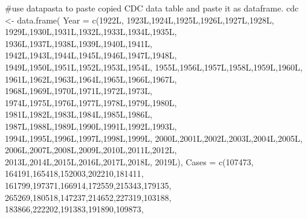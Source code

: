 \documentclass[
  letterpaper,
  DIV=11,
  numbers=noendperiod]{scrartcl}
\newenvironment{Shaded}{\begin{snugshade}}{\end{snugshade}}
\newcommand{\AttributeTok}[1]{\textcolor[rgb]{0.40,0.45,0.13}{#1}}
\newcommand{\CommentTok}[1]{\textcolor[rgb]{0.37,0.37,0.37}{#1}}
\newcommand{\DecValTok}[1]{\textcolor[rgb]{0.68,0.00,0.00}{#1}}
\newcommand{\FunctionTok}[1]{\textcolor[rgb]{0.28,0.35,0.67}{#1}}
\newcommand{\NormalTok}[1]{\textcolor[rgb]{0.00,0.23,0.31}{#1}}
\newcommand{\OtherTok}[1]{\textcolor[rgb]{0.00,0.23,0.31}{#1}}
\begin{document}
\begin{Shaded}
\begin{Highlighting}[]
\CommentTok{\#use datapasta to paste copied CDC data table and paste it as dataframe.}
\NormalTok{cdc }\OtherTok{\textless{}{-}} \FunctionTok{data.frame}\NormalTok{(}
                          \AttributeTok{Year =} \FunctionTok{c}\NormalTok{(1922L,}
\NormalTok{                                   1923L,1924L,1925L,1926L,1927L,1928L,}
\NormalTok{                                   1929L,1930L,1931L,1932L,1933L,1934L,1935L,}
\NormalTok{                                   1936L,1937L,1938L,1939L,1940L,1941L,}
\NormalTok{                                   1942L,1943L,1944L,1945L,1946L,1947L,1948L,}
\NormalTok{                                   1949L,1950L,1951L,1952L,1953L,1954L,}
\NormalTok{                                   1955L,1956L,1957L,1958L,1959L,1960L,}
\NormalTok{                                   1961L,1962L,1963L,1964L,1965L,1966L,1967L,}
\NormalTok{                                   1968L,1969L,1970L,1971L,1972L,1973L,}
\NormalTok{                                   1974L,1975L,1976L,1977L,1978L,1979L,1980L,}
\NormalTok{                                   1981L,1982L,1983L,1984L,1985L,1986L,}
\NormalTok{                                   1987L,1988L,1989L,1990L,1991L,1992L,1993L,}
\NormalTok{                                   1994L,1995L,1996L,1997L,1998L,1999L,}
\NormalTok{                                   2000L,2001L,2002L,2003L,2004L,2005L,}
\NormalTok{                                   2006L,2007L,2008L,2009L,2010L,2011L,2012L,}
\NormalTok{                                   2013L,2014L,2015L,2016L,2017L,2018L,}
\NormalTok{                                   2019L),}
\AttributeTok{Cases =} \FunctionTok{c}\NormalTok{(}\DecValTok{107473}\NormalTok{,}
                                   \DecValTok{164191}\NormalTok{,}\DecValTok{165418}\NormalTok{,}\DecValTok{152003}\NormalTok{,}\DecValTok{202210}\NormalTok{,}\DecValTok{181411}\NormalTok{,}
                                   \DecValTok{161799}\NormalTok{,}\DecValTok{197371}\NormalTok{,}\DecValTok{166914}\NormalTok{,}\DecValTok{172559}\NormalTok{,}\DecValTok{215343}\NormalTok{,}\DecValTok{179135}\NormalTok{,}
                                   \DecValTok{265269}\NormalTok{,}\DecValTok{180518}\NormalTok{,}\DecValTok{147237}\NormalTok{,}\DecValTok{214652}\NormalTok{,}\DecValTok{227319}\NormalTok{,}\DecValTok{103188}\NormalTok{,}
                                   \DecValTok{183866}\NormalTok{,}\DecValTok{222202}\NormalTok{,}\DecValTok{191383}\NormalTok{,}\DecValTok{191890}\NormalTok{,}\DecValTok{109873}\NormalTok{,}

\end{Highlighting}
\end{Shaded}
\end{document}
